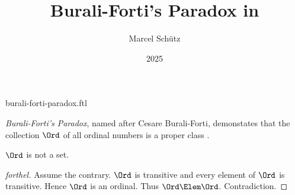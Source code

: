 \documentclass{stex}
\title{Burali-Forti's Paradox in \Naproche}
\author{Marcel Schütz}
\date{2025}
\begin{document}
\begin{smodule}{burali-forti-paradox.ftl}
\maketitle


\noindent \emph{Burali-Forti's Paradox}, named after Cesare Burali-Forti, 
demonstates that the collection $\Ord$ of all ordinal numbers is a
proper class \cite{BuraliForti1897}.

\begin{theorem}[forthel,title=Burali-Forti's Paradox,id=burali_forti_paradox]
  $\Ord$ is not a set.
\end{theorem}
\begin{proof}[forthel]
  Assume the contrary.
  $\Ord$ is transitive and every element of $\Ord$ is transitive.
  Hence $\Ord$ is an ordinal.
  Thus $\Ord \Elem \Ord$.
  Contradiction.
\end{proof}

\printbibliography
{}
\end{smodule}
\end{document}
